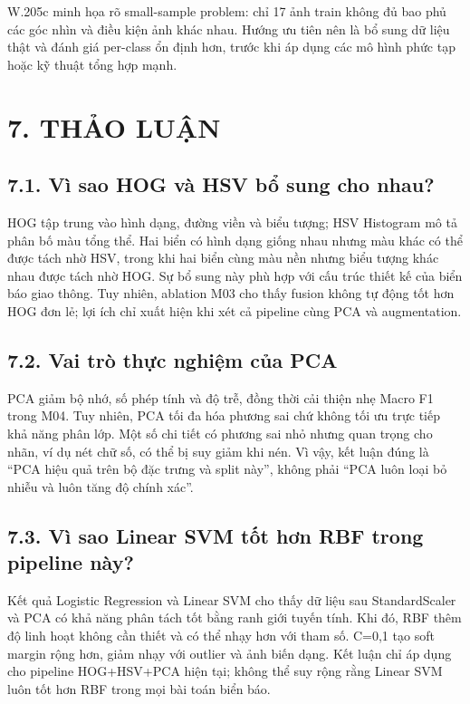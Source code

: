 \documentclass[12pt,a4paper]{article}
\begin{document}
W.205c minh họa rõ small-sample problem: chỉ 17 ảnh train không đủ bao
phủ các góc nhìn và điều kiện ảnh khác nhau. Hướng ưu tiên nên là bổ
sung dữ liệu thật và đánh giá per-class ổn định hơn, trước khi áp dụng
các mô hình phức tạp hoặc kỹ thuật tổng hợp mạnh.

\section{7. THẢO LUẬN}\label{thux1ea3o-luux1eadn}

\subsection{7.1. Vì sao HOG và HSV bổ sung cho
nhau?}\label{vuxec-sao-hog-vuxe0-hsv-bux1ed5-sung-cho-nhau}

HOG tập trung vào hình dạng, đường viền và biểu tượng; HSV Histogram mô
tả phân bố màu tổng thể. Hai biển có hình dạng giống nhau nhưng màu khác
có thể được tách nhờ HSV, trong khi hai biển cùng màu nền nhưng biểu
tượng khác nhau được tách nhờ HOG. Sự bổ sung này phù hợp với cấu trúc
thiết kế của biển báo giao thông. Tuy nhiên, ablation M03 cho thấy
fusion không tự động tốt hơn HOG đơn lẻ; lợi ích chỉ xuất hiện khi xét
cả pipeline cùng PCA và augmentation.

\subsection{7.2. Vai trò thực nghiệm của
PCA}\label{vai-truxf2-thux1ef1c-nghiux1ec7m-cux1ee7a-pca}

PCA giảm bộ nhớ, số phép tính và độ trễ, đồng thời cải thiện nhẹ Macro
F1 trong M04. Tuy nhiên, PCA tối đa hóa phương sai chứ không tối ưu trực
tiếp khả năng phân lớp. Một số chi tiết có phương sai nhỏ nhưng quan
trọng cho nhãn, ví dụ nét chữ số, có thể bị suy giảm khi nén. Vì vậy,
kết luận đúng là ``PCA hiệu quả trên bộ đặc trưng và split này'', không
phải ``PCA luôn loại bỏ nhiễu và luôn tăng độ chính xác''.

\subsection{7.3. Vì sao Linear SVM tốt hơn RBF trong pipeline
này?}\label{vuxec-sao-linear-svm-tux1ed1t-hux1a1n-rbf-trong-pipeline-nuxe0y}

Kết quả Logistic Regression và Linear SVM cho thấy dữ liệu sau
StandardScaler và PCA có khả năng phân tách tốt bằng ranh giới tuyến
tính. Khi đó, RBF thêm độ linh hoạt không cần thiết và có thể nhạy hơn
với tham số. C=0,1 tạo soft margin rộng hơn, giảm nhạy với outlier và
ảnh biến dạng. Kết luận chỉ áp dụng cho pipeline HOG+HSV+PCA hiện tại;
không thể suy rộng rằng Linear SVM luôn tốt hơn RBF trong mọi bài toán
biển báo.
\end{document}
